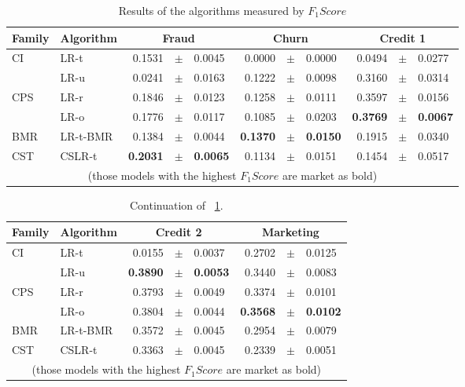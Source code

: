 \begin{table}
    \centering
    \footnotesize
    \begin{tabular}{l l r@{\hskip 0in}c@{\hskip 0in}l r@{\hskip 0in}c@{\hskip 0in}l r@{\hskip 
    0in}c@{\hskip 0in}l  } %
    \hline
    \bf{Family} & \bf{Algorithm} & \multicolumn{3}{c}{\bf{Fraud}} & 
    \multicolumn{3}{c}{\bf{Churn}} & \multicolumn{3}{c}{\bf{Credit 1}} \\ 
    \hline
CI&LR-t & 0.1531 &$\pm$& 0.0045 & 0.0000 &$\pm$& 0.0000 & 0.0494 &$\pm$& 0.0277\\ 
&LR-u & 0.0241 &$\pm$& 0.0163 & 0.1222 &$\pm$& 0.0098 & 0.3160 &$\pm$& 0.0314\\ 
\hline 
CPS&LR-r & 0.1846 &$\pm$& 0.0123 & 0.1258 &$\pm$& 0.0111 & 0.3597 &$\pm$& 0.0156\\ 
&LR-o & 0.1776 &$\pm$& 0.0117 & 0.1085 &$\pm$& 0.0203 & \bf{0.3769} &\bf{$\pm$}& \bf{0.0067}\\ 
\hline 
BMR&LR-t-BMR & 0.1384 &$\pm$& 0.0044 & \bf{0.1370} &\bf{$\pm$}& \bf{0.0150} & 0.1915 &$\pm$& 
0.0340\\ 
\hline 
CST&CSLR-t & \bf{0.2031} &\bf{$\pm$}& \bf{0.0065} & 0.1134 &$\pm$& 0.0151 & 0.1454 &$\pm$& 0.0517\\ 
\hline
  \multicolumn{11}{c}{(those models with the highest $F_1Score$ are market as bold)}
  \end{tabular}
    \caption{Results of the algorithms measured by $F_1Score$}
    \label{tab:7:results_fscore}
  \end{table}
  
\begin{table}
    \centering
    \footnotesize
    \begin{tabular}{l l r@{\hskip 0in}c@{\hskip 0in}l r@{\hskip 0in}c@{\hskip 0in}l  } %
    \hline
    \bf{Family} & \bf{Algorithm} &  \multicolumn{3}{c}{\bf{Credit 2}} 
& \multicolumn{3}{c}{\bf{Marketing}} \\ 
    \hline
CI&LR-t & 0.0155 &$\pm$& 0.0037 & 0.2702 &$\pm$& 0.0125\\ 
&LR-u & \bf{0.3890} &\bf{$\pm$}& \bf{0.0053} & 0.3440 &$\pm$& 0.0083\\ 
\hline 
CPS&LR-r & 0.3793 &$\pm$& 0.0049 & 0.3374 &$\pm$& 0.0101\\ 
&LR-o & 0.3804 &$\pm$& 0.0044 & \bf{0.3568} &\bf{$\pm$}& \bf{0.0102}\\ 
\hline 
BMR&LR-t-BMR & 0.3572 &$\pm$& 0.0045 & 0.2954 &$\pm$& 0.0079\\ 
\hline 
CST&CSLR-t & 0.3363 &$\pm$& 0.0045 & 0.2339 &$\pm$& 0.0051\\ 
\hline 
  \multicolumn{8}{c}{(those models with the highest $F_1Score$ are market as bold)}
  \end{tabular}
    \caption{Continuation of \tablename{~\ref{tab:7:results_fscore}}.}
    \label{tab:7:results_fscore2}
  \end{table}
  

